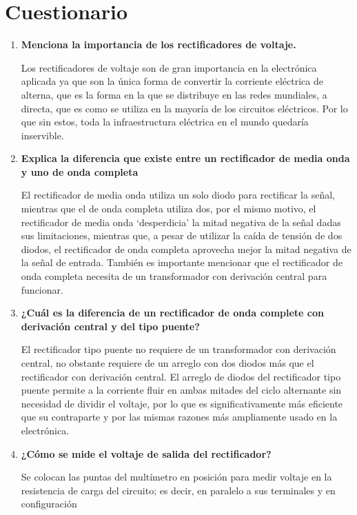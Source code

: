 \documentclass[12pt]{article}
\begin{document}
        \section*{Cuestionario}
        \label{sec:cuestionario}
        \begin{enumerate}
            \item \textbf{Menciona la importancia de los rectificadores de voltaje.}\par
                Los rectificadores de voltaje son de gran importancia en la electrónica aplicada ya que son la única forma de convertir
                la corriente eléctrica de alterna, que es la forma en la que se distribuye en las redes mundiales, a directa, que es como 
                se utiliza en la mayoría de los circuitos eléctricos. Por lo que sin estos, toda la infraestructura eléctrica en el mundo quedaría inservible. 
            \item \textbf{Explica la diferencia que existe entre un rectificador de media onda y uno de onda completa}\par
                El rectificador de media onda utiliza un solo diodo para rectificar la señal, mientras que el de onda completa utiliza dos, por el mismo motivo,
                el rectificador de media onda `desperdicia' la mitad negativa de la señal dadas sus limitaciones, mientras que, a pesar de utilizar la caída de tensión de
                dos diodos, el rectificador de onda completa aprovecha mejor la mitad negativa de la señal de entrada. También es importante mencionar que el rectificador de onda completa necesita de 
                un transformador con derivación central para funcionar.
            \item \textbf{¿Cuál es la diferencia de un rectificador de onda complete con derivación central y del tipo puente?}\par
                El rectificador tipo puente no requiere de un transformador con derivación central, no obstante requiere de un arreglo con dos diodos más que el rectificador con derivación
                central. El arreglo de diodos del rectificador tipo puente permite a la corriente fluir en ambas mitades del ciclo alternante sin necesidad de dividir el voltaje, por lo que es significativamente
                más eficiente que su contraparte y por las mismas razones más ampliamente usado en la electrónica.
            \item \textbf{¿Cómo se mide el voltaje de salida del rectificador?}\par
                Se colocan las puntas del multímetro en posición para medir voltaje en la resistencia de carga del circuito; es decir, en paralelo a sus terminales y en configuración

\end{enumerate}
\end{document}
